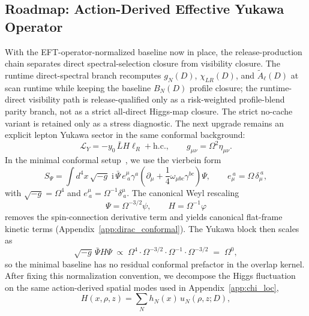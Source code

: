 \documentclass[aps,prd,onecolumn,notitlepage,nofootinbib,superscriptaddress,11pt,floatfix]{revtex4-2}
\newcommand{\ii}{\mathrm{i}}
\begin{document}
\subsection{Roadmap: Action-Derived Effective Yukawa Operator}
\label{sec:yukawa_roadmap}
With the EFT-operator-normalized baseline now in place, the release-production chain separates direct spectral-selection closure from visibility closure. The runtime direct-spectral branch recomputes $g_N(D)$, $\chi_{LR}(D)$, and $\tilde A_\ell(D)$ at scan runtime while keeping the baseline $B_N(D)$ profile closure; the runtime-direct visibility path is release-qualified only as a risk-weighted profile-blend parity branch, not as a strict all-direct Higgs-map closure. The strict no-cache variant is retained only as a stress diagnostic. The next upgrade remains an explicit lepton Yukawa sector in the same conformal background:
\begin{equation}
\mathcal{L}_{Y} = -y_0\,\bar{L}H\ell_R + \mathrm{h.c.}, \qquad g_{\mu\nu}=\Omega^2\eta_{\mu\nu}.
\end{equation}
In the minimal conformal setup~\cite{BirrellDavies1982,LawsonMichelsohn1989}, we use the vierbein form
\begin{equation}
S_\Psi=\int d^4x\,\sqrt{-g}\;\ii\,\bar{\Psi}\,e^\mu_{\ a}\gamma^a\!\left(\partial_\mu+\frac{1}{4}\omega_{\mu bc}\gamma^{bc}\right)\!\Psi,
\qquad e_\mu^{\ a}=\Omega\,\delta_\mu^{\ a},
\end{equation}
with $\sqrt{-g}=\Omega^4$ and $e^\mu_{\ a}=\Omega^{-1}\delta^\mu_{\ a}$. The canonical Weyl rescaling
\begin{equation}
\Psi=\Omega^{-3/2}\psi,\qquad H=\Omega^{-1}\varphi
\label{eq:dirac_higgs_weyl}
\end{equation}
removes the spin-connection derivative term and yields canonical flat-frame kinetic terms (Appendix~\ref{app:dirac_conformal}).
The Yukawa block then scales as
\begin{equation}
\sqrt{-g}\,\bar{\Psi}H\Psi
\;\propto\;
\Omega^{4}\cdot \Omega^{-3/2}\cdot \Omega^{-1}\cdot \Omega^{-3/2}
\;=\;\Omega^0,
\label{eq:yukawa_frame_cancel}
\end{equation}
so the minimal baseline has no residual conformal prefactor in the overlap kernel.
After fixing this normalization convention, we decompose the Higgs fluctuation on the same action-derived spatial modes used in Appendix~\ref{app:chi_loc},
\begin{equation}
H(x,\rho,z)=\sum_N h_N(x)\,u_N(\rho,z;D),
\end{equation}
\end{document}
